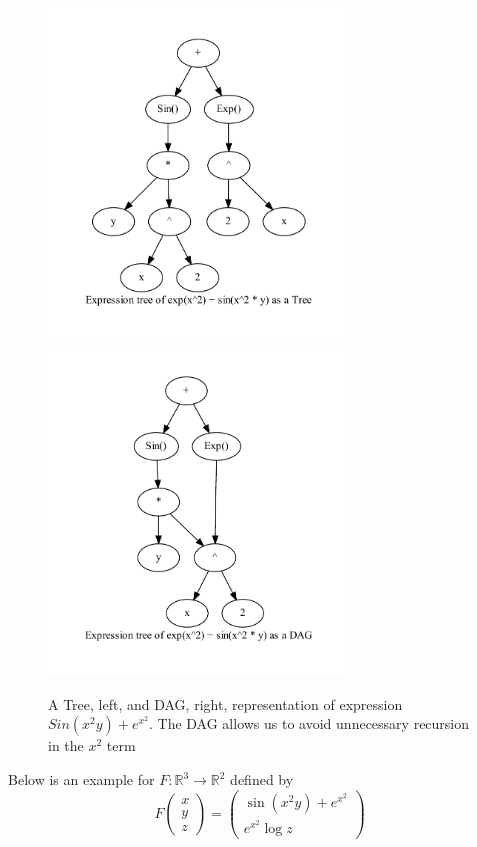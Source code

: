 \documentclass{article}
\begin{document}
\begin{figure}[h]
    \includegraphics[width=8cm]{images/Treegraph.gv.pdf}
    \includegraphics[width=8cm]{images/DAGgraph.gv.pdf}
    \caption{A Tree, left, and DAG, right, representation of expression $Sin(x^2y) + e^{x^2}$. The DAG allows us to avoid unnecessary recursion in the $x^2$ term}
    \label{fig:DAGgraph}
\end{figure}

Below is an example for $F: \mathbb{R}^3 \rightarrow \mathbb{R}^2$ defined by
\begin{equation} \label{example1}
    F \begin{pmatrix}
        x \\ y \\ z
    \end{pmatrix} = \begin{pmatrix}
        \sin (x^2 y) + e^{x^2} \\ e^{x^2} \log z
    \end{pmatrix}
\end{equation}
\end{document}
